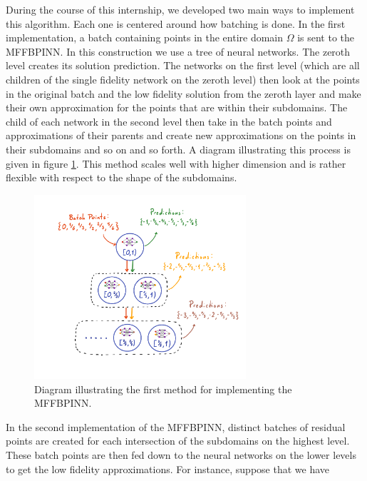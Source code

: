 \documentclass[12pt]{article}
\begin{document}
During the course of this internship, we developed two main ways to implement this algorithm. Each one is centered around how batching is done. In the first implementation, a batch containing points in the entire domain $\Omega$ is sent to the MFFBPINN. In this construction we use a tree of neural networks. The zeroth level creates its solution prediction. The networks on the first level (which are all children of the single fidelity network on the zeroth level) then look at the points in the original batch and the low fidelity solution from the zeroth layer and make their own approximation for the points that are within their subdomains. The child of each network in the second level then take in the batch points and approximations of their parents and create new approximations on the points in their subdomains and so on and so forth. A diagram illustrating this process is given in figure \ref{fig:batch1}. This method scales well with higher dimension and is rather flexible with respect to the shape of the subdomains.

\begin{figure}
\centering
\includegraphics[width=0.7\textwidth]{imgs/batch1}
\caption{Diagram illustrating the first method for implementing the MFFBPINN.}
\label{fig:batch1}
\end{figure}

In the second implementation of the MFFBPINN, distinct batches of residual points are created for each intersection of the subdomains on the highest level. These batch points are then fed down to the neural networks on the lower levels to get the low fidelity approximations. For instance, suppose that we have 

\end{document}
